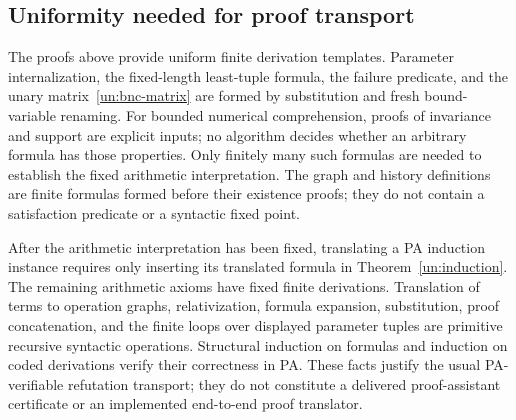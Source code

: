 \subsection{Uniformity needed for proof transport}\label{un:uniformity}

The proofs above provide uniform finite derivation templates.
Parameter internalization, the fixed-length least-tuple formula, the
failure predicate, and the unary matrix~\eqref{un:bnc-matrix} are formed
by substitution and fresh bound-variable renaming. For bounded
numerical comprehension, proofs of invariance and support are explicit
inputs; no algorithm decides whether an arbitrary formula has those
properties. Only finitely many such formulas are needed to establish
the fixed arithmetic interpretation. The graph and history definitions
are finite formulas formed before their existence proofs; they do not
contain a satisfaction predicate or a syntactic fixed point.

After the arithmetic interpretation has been fixed, translating a PA
induction instance requires only inserting its translated formula in
Theorem~\ref{un:induction}. The remaining arithmetic axioms have fixed
finite derivations. Translation of terms to operation graphs,
relativization, formula expansion, substitution, proof concatenation,
and the finite loops over displayed parameter tuples are primitive
recursive syntactic operations. Structural induction on formulas and
induction on coded derivations verify their correctness in PA. These
facts justify the usual PA-verifiable refutation transport; they do not
constitute a delivered proof-assistant certificate or an implemented
end-to-end proof translator.

